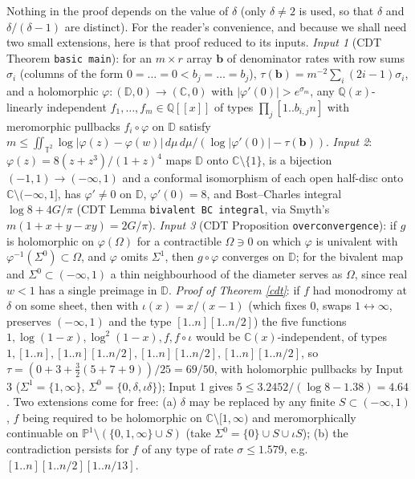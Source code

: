 \documentclass[11pt]{amsart}
\theoremstyle{remark}
\newcommand{\Q}{\mathbb Q}\newcommand{\Z}{\mathbb Z}\newcommand{\R}{\mathbb R}\newcommand{\C}{\mathbb C}
\newcommand{\PP}{\mathbb P}\newcommand{\D}{\mathbb D}\newcommand{\T}{\mathbb T}\newcommand{\Cl}{\mathrm{Cl}_2}\newcommand{\Li}{\mathrm{Li}_2}
\newcommand{\lcm}[1]{[1..#1]}
\begin{document}
Nothing in the proof depends on the value of $\delta$ (only $\delta\ne2$ is used, so that $\delta$ and $\delta/(\delta-1)$ are distinct). For the reader's convenience, and because we shall need two small extensions, here is that proof reduced to its inputs. \emph{Input 1} (CDT Theorem \texttt{basic main}): for an $m\times r$ array $\mathbf b$ of denominator rates with row sums $\sigma_i$ (columns of the form $0=\dots=0<b_j=\dots=b_j$), $\tau(\mathbf b)=m^{-2}\sum_i(2i-1)\sigma_i$, and a holomorphic $\varphi\colon(\D,0)\to(\C,0)$ with $|\varphi'(0)|>e^{\sigma_m}$, any $\Q(x)$-linearly independent $f_1,\dots,f_m\in\Q[[x]]$ of types $\prod_j\lcm{b_{i,j}n}$ with meromorphic pullbacks $f_i\circ\varphi$ on $\D$ satisfy $m\le\iint_{\T^2}\log|\varphi(z)-\varphi(w)|\,d\mu\,d\mu\big/(\log|\varphi'(0)|-\tau(\mathbf b))$. \emph{Input 2}: $\varphi(z)=8(z+z^3)/(1+z)^4$ maps $\D$ onto $\C\setminus\{1\}$, is a bijection $(-1,1)\to(-\infty,1)$ and a conformal isomorphism of each open half-disc onto $\C\setminus(-\infty,1]$, has $\varphi'\ne0$ on $\D$, $\varphi'(0)=8$, and Bost--Charles integral $\log8+4G/\pi$ (CDT Lemma \texttt{bivalent BC integral}, via Smyth's $m(1+x+y-xy)=2G/\pi$). \emph{Input 3} (CDT Proposition \texttt{overconvergence}): if $g$ is holomorphic on $\varphi(\Omega)$ for a contractible $\Omega\ni0$ on which $\varphi$ is univalent with $\varphi^{-1}(\Sigma^0)\subset\Omega$, and $\varphi$ omits $\Sigma^1$, then $g\circ\varphi$ converges on $\D$; for the bivalent map and $\Sigma^0\subset(-\infty,1)$ a thin neighbourhood of the diameter serves as $\Omega$, since real $w<1$ has a single preimage in $\D$. \emph{Proof of Theorem \ref{cdt}}: if $f$ had monodromy at $\delta$ on some sheet, then with $\iota(x)=x/(x-1)$ (which fixes $0$, swaps $1\leftrightarrow\infty$, preserves $(-\infty,1)$ and the type $\lcm n\lcm{n/2}$) the five functions $1,\log(1-x),\log^2(1-x),f,f\circ\iota$ would be $\C(x)$-independent, of types $1,\lcm n,\lcm n\lcm{n/2},\lcm n\lcm{n/2},\lcm n\lcm{n/2}$, so $\tau=(0+3+\frac32(5+7+9))/25=69/50$, with holomorphic pullbacks by Input 3 ($\Sigma^1=\{1,\infty\}$, $\Sigma^0=\{0,\delta,\iota\delta\}$); Input 1 gives $5\le3.2452/(\log8-1.38)=4.64$. Two extensions come for free: (a) $\delta$ may be replaced by any finite $S\subset(-\infty,1)$, $f$ being required to be holomorphic on $\C\setminus[1,\infty)$ and meromorphically continuable on $\PP^1\setminus(\{0,1,\infty\}\cup S)$ (take $\Sigma^0=\{0\}\cup S\cup\iota S$); (b) the contradiction persists for $f$ of any type of rate $\sigma\le1.579$, e.g.\ $\lcm n\lcm{n/2}\lcm{n/13}$.
\end{document}
